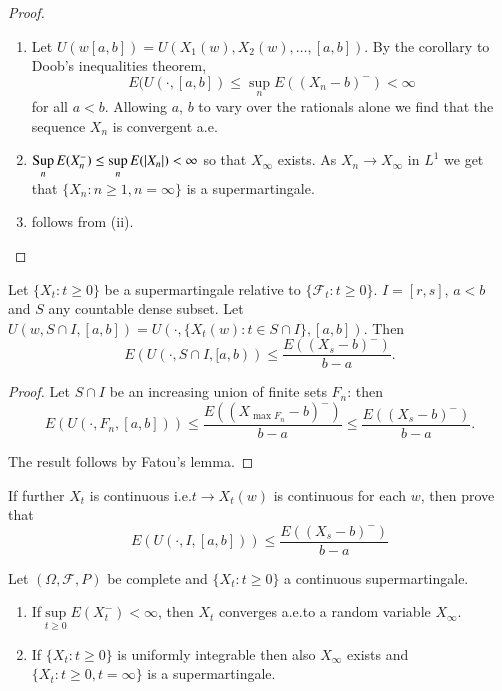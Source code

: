 \begin{proof}
\begin{enumerate}
\renewcommand{\theenumi}{\roman{enumi}}
\renewcommand{\labelenumi}{(\theenumi)}
\item Let $U(w[a,b])=U(X_{1}(w),X_{2}(w),\ldots,[a,b])$. By the
  coro\-llary to Doob's inequalities theorem,
$$
E(U(\cdot,[a,b])\leq \sup\limits_{n}E((X_{n}-b)^{-})<\infty
$$\pageoriginale
for all $a<b$. Allowing $a$, $b$ to vary over the rationals alone we
find that the sequence $X_{n}$ is convergent a.e.

\item $\operatorname*{Sup}\limits_{n}E(X^{-}_{n})\leq
  \sup\limits_{n}E(|X_{n}|)<\infty$ so that $X_{\infty}$ exists. As
  $X_{n}\to X_{\infty}$ in $L^{1}$ we get that $\{X_{n}:n\geq
  1,n=\infty\}$ is a supermartingale.

\item follows from (ii).
\end{enumerate}
\end{proof}

\begin{prop*}
Let $\{X_{t}:t\geq 0\}$ be a supermartingale relative to
$\{\mathscr{F}_{t}:t\geq 0\}$. $I=[r,s]$, $a<b$ and $S$ any countable
dense subset. Let $U(w,S\cap I,[a,b])=U(\cdot,\{X_{t}(w):t\in S\cap
I\},[a,b])$. Then
$$
E(U(\cdot,S\cap I,[a,b))\leq \frac{E((X_{s}-b)^{-})}{b-a}.
$$
\end{prop*}

\begin{proof}
Let $S\cap I$ be an increasing union of finite sets $F_{n}$: then
$$
E(U(\cdot,F_{n},[a,b]))\leq 
\frac{E((X_{\max F_{n}}-b)^{-})}{b-a}\leq
\frac{E((X_{s}-b)^{-})}{b-a}. 
$$

The result follows by Fatou's lemma.
\end{proof}

\begin{exer*}
If further $X_{t}$ is continuous i.e.\@ $t\to X_{t}(w)$ is continuous
for each $w$, then prove that
$$
E(U(\cdot,I,[a,b]))\leq \frac{E((X_{s}-b)^{-})}{b-a}
$$
\end{exer*}

\begin{theorem*}
Let $(\Omega,\mathscr{F},P)$ be complete and $\{X_{t}:t\geq 0\}$ a
continuous supermartingale.
\begin{enumerate}
\renewcommand{\theenumi}{\roman{enumi}}
\renewcommand{\labelenumi}{\rm(\theenumi)}
\item If\pageoriginale $\sup\limits_{t\geq 0}E(X^{-}_{t})<\infty$, then $X_{t}$
  converges a.e.\@ to a random variable $X_{\infty}$.

\item If $\{X_{t}:t\geq 0\}$ is uniformly integrable then also
  $X_{\infty}$ exists and $\{X_{t}:t\geq 0,t=\infty\}$ is a supermartingale.
\end{enumerate}
\end{theorem*}

